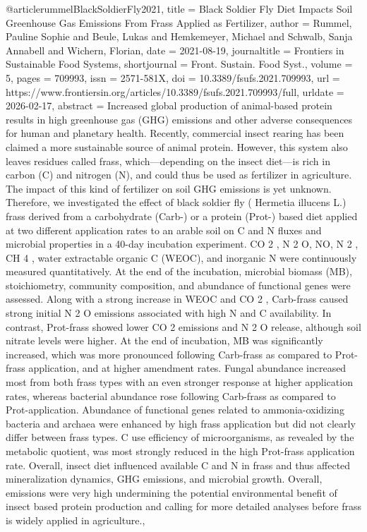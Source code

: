{{{{@article{rummelBlackSoldierFly2021,
  title = {Black {{Soldier Fly Diet Impacts Soil Greenhouse Gas Emissions From Frass Applied}} as {{Fertilizer}}},
  author = {Rummel, Pauline Sophie and Beule, Lukas and Hemkemeyer, Michael and Schwalb, Sanja Annabell and Wichern, Florian},
  date = {2021-08-19},
  journaltitle = {Frontiers in Sustainable Food Systems},
  shortjournal = {Front. Sustain. Food Syst.},
  volume = {5},
  pages = {709993},
  issn = {2571-581X},
  doi = {10.3389/fsufs.2021.709993},
  url = {https://www.frontiersin.org/articles/10.3389/fsufs.2021.709993/full},
  urldate = {2026-02-17},
  abstract = {Increased global production of animal-based protein results in high greenhouse gas (GHG) emissions and other adverse consequences for human and planetary health. Recently, commercial insect rearing has been claimed a more sustainable source of animal protein. However, this system also leaves residues called frass, which—depending on the insect diet—is rich in carbon (C) and nitrogen (N), and could thus be used as fertilizer in agriculture. The impact of this kind of fertilizer on soil GHG emissions is yet unknown. Therefore, we investigated the effect of black soldier fly (               Hermetia illucens               L.) frass derived from a carbohydrate (Carb-) or a protein (Prot-) based diet applied at two different application rates to an arable soil on C and N fluxes and microbial properties in a 40-day incubation experiment. CO               2               , N               2               O, NO, N               2               , CH               4               , water extractable organic C (WEOC), and inorganic N were continuously measured quantitatively. At the end of the incubation, microbial biomass (MB), stoichiometry, community composition, and abundance of functional genes were assessed. Along with a strong increase in WEOC and CO               2               , Carb-frass caused strong initial N               2               O emissions associated with high N and C availability. In contrast, Prot-frass showed lower CO               2               emissions and N               2               O release, although soil nitrate levels were higher. At the end of incubation, MB was significantly increased, which was more pronounced following Carb-frass as compared to Prot-frass application, and at higher amendment rates. Fungal abundance increased most from both frass types with an even stronger response at higher application rates, whereas bacterial abundance rose following Carb-frass as compared to Prot-application. Abundance of functional genes related to ammonia-oxidizing bacteria and archaea were enhanced by high frass application but did not clearly differ between frass types. C use efficiency of microorganisms, as revealed by the metabolic quotient, was most strongly reduced in the high Prot-frass application rate. Overall, insect diet influenced available C and N in frass and thus affected mineralization dynamics, GHG emissions, and microbial growth. Overall, emissions were very high undermining the potential environmental benefit of insect based protein production and calling for more detailed analyses before frass is widely applied in agriculture.},
}}}}}
